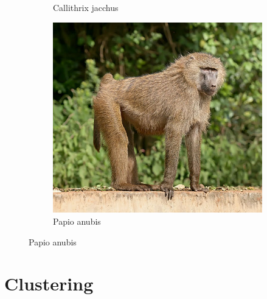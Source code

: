 \documentclass[a4paper, 12pt, one column]{article}
\begin{document}
\begin{figure}[H]
\begin{subfigure}{.3\textwidth}
        \caption{Callithrix jacchus}
        \label{fig:Callithrix jacchus}
    \end{subfigure}
    \begin{subfigure}{.3\textwidth}
        \centering
        \includegraphics[width=.4\linewidth]{Papio anubis.jpeg}
        \caption{Papio anubis}
        \label{fig:Papio anubis}
    \end{subfigure}
\end{figure}


\section{Clustering}
\end{document}
